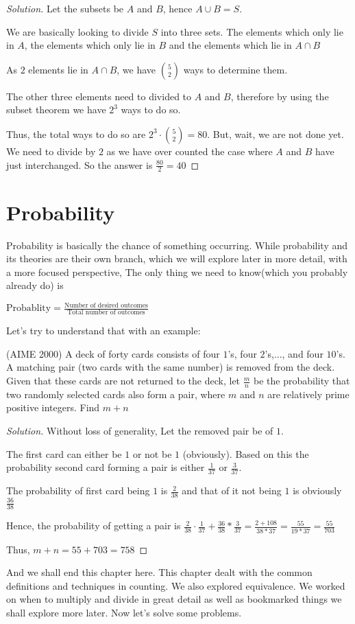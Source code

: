 \begin{proof}
    [Solution]
    Let the subsets be $A$ and $B$, hence $A \cup B = S$.\par
    We are basically looking to divide $S$ into three sets. The elements which only 
    lie in $A$, the elements which only lie in $B$ and the elements which lie in $A \cap B$\par
    As $2$ elements lie in $A \cap B$, we have $\binom{5}{2}$ ways to determine them.\par
    The other three elements need to divided to $A$ and $B$, therefore by using the 
    subset theorem we have $2^3$ ways to do so.\par
    Thus, the total ways to do so are $2^3 \cdot \binom{5}{2}=80$. But, wait, we 
    are not done yet. We need to divide by $2$ as we have over counted the case where 
    $A$ and $B$ have just interchanged. So the answer is $\frac{80}{2}=\boxed{40}$
\end{proof}
\section{Probability}
Probability is basically the chance of something occurring. While probability and its 
theories are their own branch, which we will explore later in more detail, with a more 
focused perspective, The only thing we need to know(which you probably already do) is
\begin{theorem}
    $\text{Probablity} = \frac{\text{Number of desired outcomes}}{\text{Total number of outcomes}}$
\end{theorem}
Let's try to understand that with an example:
\begin{example}
    (AIME 2000) A deck of forty cards consists of 
    four $1$’s, four $2$’s,..., and four $10$’s. A matching 
    pair (two cards with the same number) is removed from the deck. 
    Given that these cards are not returned to the deck, let $\frac{m}{n}$ be the
     probability that two randomly selected cards also form a pair, where $m$ and $n$ are 
     relatively prime positive integers. Find $m + n$
\end{example}
\begin{proof}
    [Solution]
    Without loss of generality, Let the removed pair be of $1$.\par
    The first card can either be $1$ or not be $1$ (obviously). Based on this the 
    probability second card forming a pair is either $\frac{1}{37}$ or $\frac{3}{37}$.\par
    The probability of first card being $1$ is $\frac{2}{38}$ and that of it 
    not being $1$ is obviously $\frac{36}{38}$\par
    Hence, the probability of getting a pair is 
    $\frac{2}{38}\cdot\frac{1}{37}+\frac{36}{38}*\frac{3}{37}=\frac{2+108}{38*37}=\frac{55}{19*37}=\frac{55}{703}$\par
    Thus, $m+n=55+703=758$
\end{proof}
And we shall end this chapter here. This chapter dealt with the common definitions and techniques 
in counting. We also explored equivalence. We worked on when to multiply and divide in great 
detail as well as bookmarked things we shall explore more later. Now let's solve some problems.

